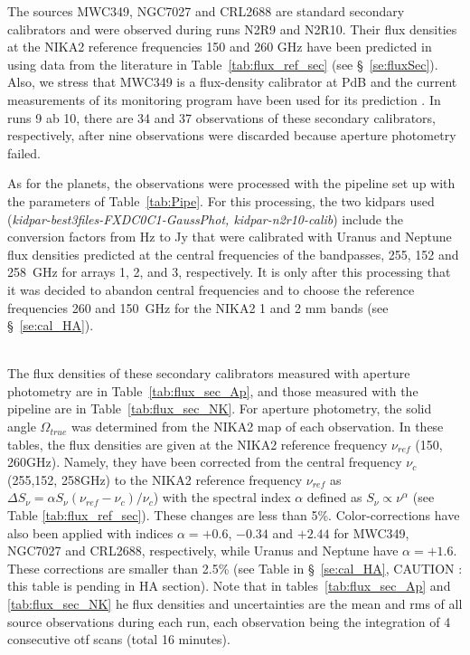 The sources  MWC349, NGC7027 and CRL2688 are standard secondary calibrators
and were observed during runs N2R9 and N2R10. Their flux densities at the NIKA2 reference frequencies 150 and 260 GHz
have been predicted  in using data from the literature
in Table~\ref{tab:flux_ref_sec} (see \S~\ref{se:fluxSec}).  Also, we stress that MWC349 is a flux-density calibrator at PdB and
the current measurements of its monitoring program have been used for its prediction \cite{krips}.
In runs 9 ab 10, there are 34 and 37 observations of these secondary calibrators, respectively, after nine observations were discarded because
aperture photometry failed.

As for the planets, the observations were processed with the pipeline set up with the parameters
of Table~\ref{tab:Pipe}. For this processing,
the two kidpars used ({\it kidpar-best3files-FXDC0C1-GaussPhot, kidpar-n2r10-calib})  include the conversion factors
from Hz to Jy that were calibrated with Uranus and Neptune flux densities predicted at the central frequencies
of the bandpasses, 255, 152 and 258~GHz for arrays 1, 2,
and 3,  respectively. It is only after this processing that it was decided to abandon central frequencies
and to choose the reference frequencies 260 and 150~GHz for the NIKA2 1 and 2 mm  bands (see \S~\ref{se:cal_HA}).


\\


The flux densities of these secondary calibrators measured with  aperture photometry are in Table~\ref{tab:flux_sec_Ap},
and those measured with  the pipeline are in Table~\ref{tab:flux_sec_NK}. For aperture photometry, the solid angle $\Omega_{true}$
was determined from the NIKA2 map of each observation.
In these tables, the flux densities are given at the NIKA2 reference frequency $\nu_{ref}$ (150, 260GHz). Namely, they 
have been corrected  from
the central frequency $\nu_c$ (255,152, 258GHz) to the NIKA2 reference frequency  $\nu_{ref}$ as   
$\Delta S_{\nu}  = \alpha S_{\nu} (\nu_{ref}-\nu_c)/\nu_c $) with the spectral index $\alpha$ defined
as $S_{\nu} \propto \nu^{\alpha}$ (see Table \ref{tab:flux_ref_sec}). These changes are less than 5\%.
Color-corrections have also been applied
with indices $\alpha=+0.6$, $-0.34$ and $+2.44$ for MWC349, NGC7027 and CRL2688, respectively, while Uranus and
Neptune have $\alpha=+1.6$. These corrections are smaller than 2.5\% (see Table in
\S~\ref{se:cal_HA}, CAUTION : this table is pending in  HA section).  
Note that in tables~\ref{tab:flux_sec_Ap} and \ref{tab:flux_sec_NK} 
he flux densities and uncertainties are  the mean and rms of all source observations during each run,   
each observation being the integration of 4 consecutive otf scans (total 16 minutes). 


